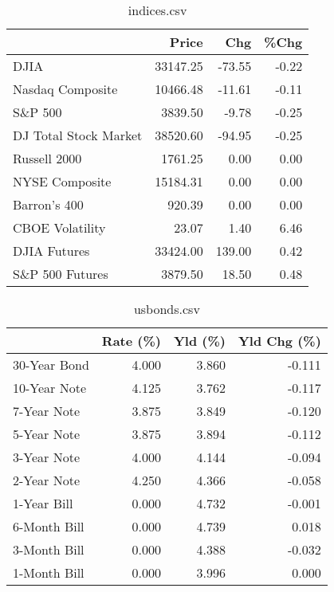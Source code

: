 \documentclass{article}%
\begin{document}
\begin{table}[htbp]%
\caption{indices.csv}%
\centering%
\begin{adjustbox}{width=1\textwidth}%
\begin{tabular}{lrrr}
\toprule
                      &    Price &    Chg &  \%Chg \\
\midrule
                 DJIA & 33147.25 & -73.55 & -0.22 \\
     Nasdaq Composite & 10466.48 & -11.61 & -0.11 \\
              S\&P 500 &  3839.50 &  -9.78 & -0.25 \\
DJ Total Stock Market & 38520.60 & -94.95 & -0.25 \\
         Russell 2000 &  1761.25 &   0.00 &  0.00 \\
       NYSE Composite & 15184.31 &   0.00 &  0.00 \\
         Barron's 400 &   920.39 &   0.00 &  0.00 \\
      CBOE Volatility &    23.07 &   1.40 &  6.46 \\
         DJIA Futures & 33424.00 & 139.00 &  0.42 \\
      S\&P 500 Futures &  3879.50 &  18.50 &  0.48 \\
\bottomrule
\end{tabular}
%
\end{adjustbox}%
\end{table}

%


\begin{table}[htbp]%
\caption{usbonds.csv}%
\centering%
\begin{adjustbox}{width=1\textwidth}%
\begin{tabular}{lrrr}
\toprule
             &  Rate (\%) &  Yld (\%) &  Yld Chg (\%) \\
\midrule
30-Year Bond &     4.000 &    3.860 &       -0.111 \\
10-Year Note &     4.125 &    3.762 &       -0.117 \\
 7-Year Note &     3.875 &    3.849 &       -0.120 \\
 5-Year Note &     3.875 &    3.894 &       -0.112 \\
 3-Year Note &     4.000 &    4.144 &       -0.094 \\
 2-Year Note &     4.250 &    4.366 &       -0.058 \\
 1-Year Bill &     0.000 &    4.732 &       -0.001 \\
6-Month Bill &     0.000 &    4.739 &        0.018 \\
3-Month Bill &     0.000 &    4.388 &       -0.032 \\
1-Month Bill &     0.000 &    3.996 &        0.000 \\
\bottomrule
\end{tabular}
%
\end{adjustbox}%
\end{table}
\end{document}
